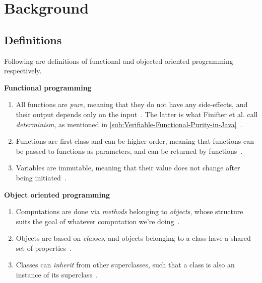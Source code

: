 \documentclass[a4paper,12pt]{article}
\begin{document}

\section{Background} \label{sec:Background} %

\subsection{Definitions} \label{sub:Definitions}
Following are definitions of functional and objected oriented programming respectively.

\textbf{Functional programming}

\begin{enumerate}
  \item All functions are \emph{pure}, meaning that they do not have any side-effects, and their output depends only on the input~\cite{john-m-chambers}. The latter is what Finifter et al. call \textit{determinism}, as mentioned in \autoref{sub:Verifiable-Functional-Purity-in-Java}~\cite{purity-in-java}.
\item Functions are first-class and can be higher-order, meaning that functions can be passed to functions as parameters, and can be returned by functions~\cite{jonas-walter}. %
\item Variables are immutable, meaning that their value does not change after being initiated~\cite{jonas-walter}. %
\end{enumerate}

\textbf{Object oriented programming} %

\begin{enumerate}
\item Computations are done via \emph{methods} belonging to \emph{objects}, whose structure suits the goal of whatever computation we're doing~\cite{john-m-chambers}.
\item Objects are based on \emph{classes}, and objects belonging to a class have a shared set of properties~\cite{john-m-chambers}.
\item Classes can \emph{inherit} from other superclasses, such that a class is also an instance of its superclass~\cite{john-m-chambers}.
\end{enumerate}
\end{document}
